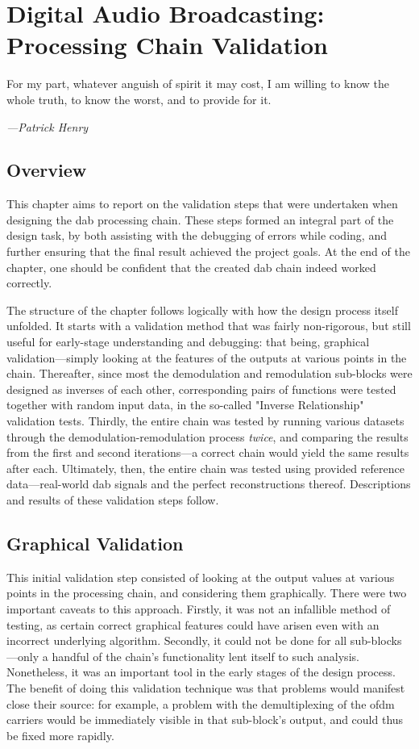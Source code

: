\documentclass[class=report,11pt,crop=false]{standalone}
\begin{document}
\ifstandalone
\tableofcontents
\fi
\chapter{Digital Audio Broadcasting: Processing Chain Validation}
\epigraph{For my part, whatever anguish of spirit it may cost, I am willing to know the whole truth, to know the worst, and to provide for it.}%
{\emph{---{Patrick Henry}}}

\section{Overview}
This chapter aims to report on the validation steps that were undertaken when designing the \gls{dab} processing chain. These steps formed an integral part of the design task, by both assisting with the debugging of errors while coding, and further ensuring that the final result achieved the project goals. At the end of the chapter, one should be confident that the created \gls{dab} chain indeed worked correctly.

The structure of the chapter follows logically with how the design process itself unfolded. It starts with a validation method that was fairly non-rigorous, but still useful for early-stage understanding and debugging: that being, graphical validation---simply looking at the features of the outputs at various points in the chain. Thereafter, since most the demodulation and remodulation sub-blocks were designed as inverses of each other, corresponding pairs of functions were tested together with random input data, in the so-called "Inverse Relationship" validation tests. Thirdly, the entire chain was tested by running various datasets through the demodulation-remodulation process \emph{twice}, and comparing the results from the first and second iterations---a correct chain would yield the same results after each. Ultimately, then, the entire chain was tested using provided reference data---real-world \gls{dab} signals and the perfect reconstructions thereof. Descriptions and results of these validation steps follow.

\section{Graphical Validation}
This initial validation step consisted of looking at the output values at various points in the processing chain, and considering them graphically. There were two important caveats to this approach. Firstly, it was not an infallible method of testing, as certain correct graphical features could have arisen even with an incorrect underlying algorithm. Secondly, it could not be done for all sub-blocks---only a handful of the chain's functionality lent itself to such analysis. Nonetheless, it was an important tool in the early stages of the design process. The benefit of doing this validation technique was that problems would manifest close their source: for example, a problem with the demultiplexing of the \gls{ofdm} carriers would be immediately visible in that sub-block's output, and could thus be fixed more rapidly.
\end{document}
